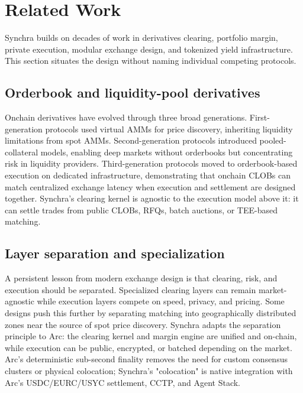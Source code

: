 \documentclass[11pt,a4paper]{article}
\begin{document}
\section{Related Work}
\label{sec:related}

Synchra builds on decades of work in derivatives clearing, portfolio margin, private execution, modular exchange design, and tokenized yield infrastructure. This section situates the design without naming individual competing protocols.

\subsection{Orderbook and liquidity-pool derivatives}

Onchain derivatives have evolved through three broad generations. First-generation protocols used virtual AMMs for price discovery, inheriting liquidity limitations from spot AMMs. Second-generation protocols introduced pooled-collateral models, enabling deep markets without orderbooks but concentrating risk in liquidity providers. Third-generation protocols moved to orderbook-based execution on dedicated infrastructure, demonstrating that onchain CLOBs can match centralized exchange latency when execution and settlement are designed together. Synchra's clearing kernel is agnostic to the execution model above it: it can settle trades from public CLOBs, RFQs, batch auctions, or TEE-based matching.

\subsection{Layer separation and specialization}

A persistent lesson from modern exchange design is that clearing, risk, and execution should be separated. Specialized clearing layers can remain market-agnostic while execution layers compete on speed, privacy, and pricing. Some designs push this further by separating matching into geographically distributed zones near the source of spot price discovery. Synchra adapts the separation principle to Arc: the clearing kernel and margin engine are unified and on-chain, while execution can be public, encrypted, or batched depending on the market. Arc's deterministic sub-second finality removes the need for custom consensus clusters or physical colocation; Synchra's "colocation" is native integration with Arc's USDC/EURC/USYC settlement, CCTP, and Agent Stack.
\end{document}

